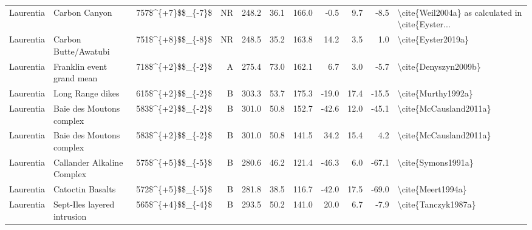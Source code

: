 \begin{longtable}{p{1 in}p{1 in}rrrrrrrr}
                     Laurentia &                                    Carbon Canyon &      757\$\textasciicircum \{+7\}\$\$\_\{-7\}\$ &     NR &     248.2 &      36.1 & 166.0 &  -0.5 &       9.7 &        -8.5 &  \textbackslash cite\{Weil2004a\} as calculated in \textbackslash cite\{Eyster... \\
                     Laurentia &                             Carbon Butte/Awatubi &      751\$\textasciicircum \{+8\}\$\$\_\{-8\}\$ &     NR &     248.5 &      35.2 & 163.8 &  14.2 &       3.5 &         1.0 &                                 \textbackslash cite\{Eyster2019a\} \\
                     Laurentia &                        Franklin event grand mean &      718\$\textasciicircum \{+2\}\$\$\_\{-2\}\$ &      A &     275.4 &      73.0 & 162.1 &   6.7 &       3.0 &        -5.7 &                               \textbackslash cite\{Denyszyn2009b\} \\
                     Laurentia &                                 Long Range dikes &      615\$\textasciicircum \{+2\}\$\$\_\{-2\}\$ &      B &     303.3 &      53.7 & 175.3 & -19.0 &      17.4 &       -15.5 &                                 \textbackslash cite\{Murthy1992a\} \\
                     Laurentia &                         Baie des Moutons complex &      583\$\textasciicircum \{+2\}\$\$\_\{-2\}\$ &      B &     301.0 &      50.8 & 152.7 & -42.6 &      12.0 &       -45.1 &                             \textbackslash cite\{McCausland2011a\} \\
                     Laurentia &                         Baie des Moutons complex &      583\$\textasciicircum \{+2\}\$\$\_\{-2\}\$ &      B &     301.0 &      50.8 & 141.5 &  34.2 &      15.4 &         4.2 &                             \textbackslash cite\{McCausland2011a\} \\
                     Laurentia &                       Callander Alkaline Complex &      575\$\textasciicircum \{+5\}\$\$\_\{-5\}\$ &      B &     280.6 &      46.2 & 121.4 & -46.3 &       6.0 &       -67.1 &                                 \textbackslash cite\{Symons1991a\} \\
                     Laurentia &                                 Catoctin Basalts &      572\$\textasciicircum \{+5\}\$\$\_\{-5\}\$ &      B &     281.8 &      38.5 & 116.7 & -42.0 &      17.5 &       -69.0 &                                  \textbackslash cite\{Meert1994a\} \\
                     Laurentia &                      Sept-Iles layered intrusion &      565\$\textasciicircum \{+4\}\$\$\_\{-4\}\$ &      B &     293.5 &      50.2 & 141.0 &  20.0 &       6.7 &        -7.9 &                                \textbackslash cite\{Tanczyk1987a\} \\
\end{longtable}
